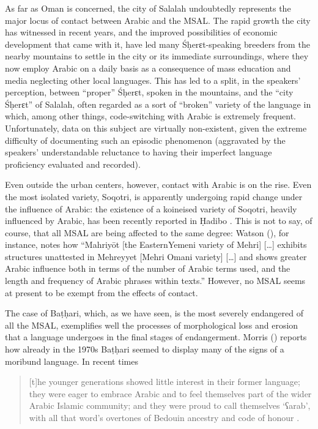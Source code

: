\documentclass[output=paper]{langsci/langscibook}
\begin{document}
As far as Oman is concerned, the city of Salalah undoubtedly represents the major locus of contact between Arabic and the MSAL. The rapid growth the city has witnessed in recent years, and the improved possibilities of economic development that came with it, have led many Śḥerɛt-speaking breeders from the nearby mountains to settle in the city or its immediate surroundings, where they now employ Arabic on a daily basis as a consequence of mass education and media neglecting other local languages. This has led to a split, in the speakers’ perception, between ``proper'' Śḥerɛt, spoken in the mountains, and the ``city Śḥerɛt'' of Salalah, often regarded as a sort of ``broken'' variety of the language in which, among other things, code-switching with Arabic is extremely frequent. Unfortunately, data on this subject are virtually non-existent, given the extreme difficulty of documenting such an episodic phenomenon (aggravated by the speakers’ understandable reluctance to having their imperfect language proficiency evaluated and recorded). 

Even outside the urban centers, however, contact with Arabic is on the rise. Even the most isolated variety, Soqotri, is apparently undergoing rapid change under the influence of Arabic: the existence of a koineised variety of Soqotri, heavily influenced by Arabic, has been recently reported in Ḥadibo \citep[27]{Morris2017}. This is not to say, of course, that all MSAL are being affected to the same degree: Watson (\citeyear[3]{Watson2012}), for instance, notes how “Mahriyōt [the EasternYemeni variety of Mehri] […] exhibits structures unattested in Mehreyyet [Mehri Omani variety] […] and shows greater Arabic influence both in terms of the number of Arabic terms used, and the length and frequency of Arabic phrases within texts.” However, no MSAL seems at present to be exempt from the effects of contact.

The case of Baṭḥari, which, as we have seen, is the most severely endangered of all the MSAL, exemplifies well the processes of morphological loss and erosion that a language undergoes in the final stages of endangerment. Morris (\citeyear[12]{Morris2017}) reports how already in the 1970s Baṭḥari seemed to display many of the signs of a moribund language. In recent times

\begin{quote}
[t]he younger generations showed little interest in their former language; they were eager to embrace Arabic and to feel themselves part of the wider Arabic Islamic community; and they were proud to call themselves ‘ʕarab’, with all that word’s overtones of Bedouin ancestry and code of honour \citep[11]{Morris2017}.
\end{quote}
\end{document}
